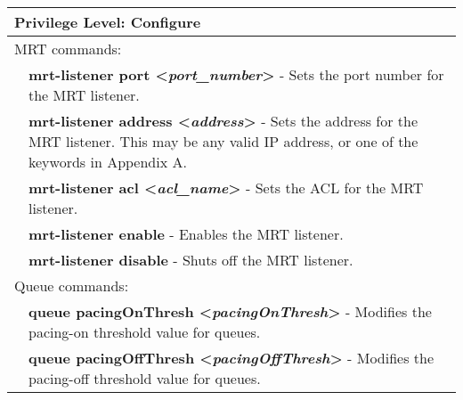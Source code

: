 \newpage
\begin{tabular}{|p{10pt}p{400pt}|}

\hline

\multicolumn{2}{|l|}{{\bf Privilege Level:} Configure}\\

\hline

\multicolumn{2}{|l|}{MRT commands:}\\

\hline

& {\bf \small mrt-listener port \textless\emph{port\_number}\textgreater} - Sets the port number for the MRT listener.\\[4pt]

& {\bf \small mrt-listener address \textless\emph{address}\textgreater} - Sets the address for the MRT listener.  This may be any valid IP address, or one of the keywords in Appendix A.\\[4pt]

& {\bf \small mrt-listener acl \textless\emph{acl\_name}\textgreater} - Sets the ACL for the MRT listener.\\[4pt]

& {\bf \small mrt-listener enable} - Enables the MRT listener.\\[4pt]

& {\bf \small mrt-listener disable} - Shuts off the MRT listener.\\[4pt]



\hline

\multicolumn{2}{|l|}{Queue commands:}\\ 

\hline

& {\bf \small queue pacingOnThresh \textless\emph{pacingOnThresh}\textgreater} - Modifies the pacing-on threshold value for queues.\\[4pt]

& {\bf \small queue pacingOffThresh \textless\emph{pacingOffThresh}\textgreater} - Modifies the pacing-off threshold value for queues.\\[4pt]


\end{tabular}
